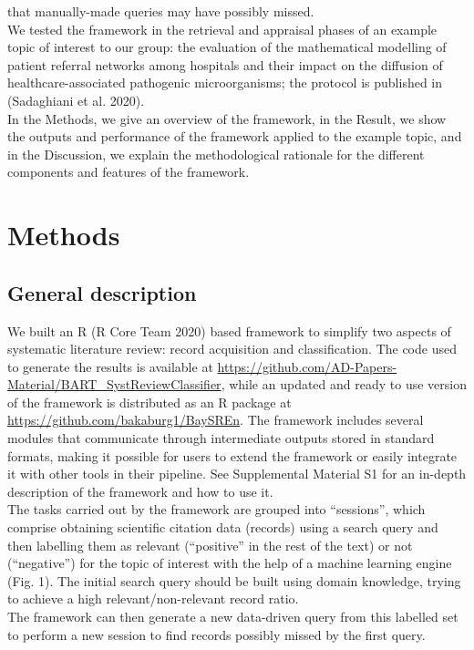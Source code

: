 \documentclass{article}
\begin{document}
that manually-made queries may have possibly missed.\\
We tested the framework in the retrieval and appraisal phases of an
example topic of interest to our group: the evaluation of the
mathematical modelling of patient referral networks among hospitals and
their impact on the diffusion of healthcare-associated pathogenic
microorganisms; the protocol is published in (Sadaghiani et al. 2020).\\
In the Methods, we give an overview of the framework, in the Result, we
show the outputs and performance of the framework applied to the example
topic, and in the Discussion, we explain the methodological rationale
for the different components and features of the framework.\\

\hypertarget{methods}{%
\section{Methods}\label{methods}}

\hypertarget{general-description}{%
\subsection{General description}\label{general-description}}

We built an R (R Core Team 2020) based framework to simplify two aspects
of systematic literature review: record acquisition and classification.
The code used to generate the results is available at
\url{https://github.com/AD-Papers-Material/BART_SystReviewClassifier},
while an updated and ready to use version of the framework is
distributed as an R package at
\url{https://github.com/bakaburg1/BaySREn}. The framework includes
several modules that communicate through intermediate outputs stored in
standard formats, making it possible for users to extend the framework
or easily integrate it with other tools in their pipeline. See
Supplemental Material S1 for an in-depth description of the framework
and how to use it.\\
The tasks carried out by the framework are grouped into ``sessions'',
which comprise obtaining scientific citation data (records) using a
search query and then labelling them as relevant (``positive'' in the
rest of the text) or not (``negative'') for the topic of interest with
the help of a machine learning engine (Fig. 1). The initial search query
should be built using domain knowledge, trying to achieve a high
relevant/non-relevant record ratio.\\
The framework can then generate a new data-driven query from this
labelled set to perform a new session to find records possibly missed by
the first query.\\
\end{document}
